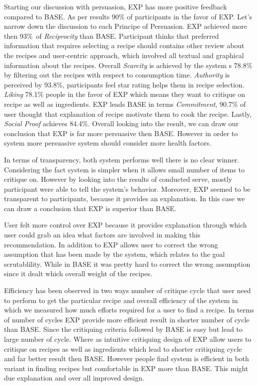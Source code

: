 Starting our discussion with persuasion, EXP has more positive feedback compared to BASE. As per results 90\% of participants in the favor of EXP. Let’s narrow down the discussion to each Principe of Persuasion.  EXP achieved more then 93\%\ of \textit{Reciprocity} than BASE. Participant thinks that preferred information that requires selecting a recipe should contains other review about the recipes and user-centric approach, which involved all textual and graphical information about the recipes.  Overall \textit{Scarcity} is achieved by the system s 78.8\% by filtering out the recipes with respect to consumption time. \textit{Authority} is perceived by 93.8\%, participants feel star rating helps them in recipe selection. \textit{Liking} 78.1\% people in the favor of EXP which means they want to critique on recipe as well as ingredients. EXP leads BASE in terms \textit{Commitment}, 90.7\% of user thought that explanation of recipe motivate them to cook the recipe. Lastly, 
\textit{Social Proof} achieves 84.4\%. Overall looking into the result, we can draw our conclusion that EXP is far more persuasive then BASE. However in order to system more persuasive system should consider more health factors. \newline

In terms of transparency, both system performs well there is no clear winner. Considering the fact system is simpler when it allows small number of items to critique on. However by looking into the results of conducted serve, mostly participant were able to tell the system’s behavior. Moreover, EXP seemed to be transparent to participants, because it provides an explanation. In this case we can draw a conclusion that EXP is superior than BASE. \newline

User felt more control over EXP because it provides explanation through which user could grab an idea what factors are involved in making this recommendation. In addition to EXP allows user to correct the wrong assumption that has been made by the system, which relates to the goal scrutablility. While in BASE it was pretty hard to correct the wrong assumption since it dealt which overall weight of the recipes. \newline

Efficiency has been observed in two ways number of critique cycle that user need to perform to get the particular recipe and overall efficiency of the system in which we measured how much efforts required for a user to find a recipe. In terms of number of cycles EXP provide more efficient result in shorter number of cycle than BASE. Since the critiquing criteria followed by BASE is easy but lead to large number of cycle. Where as intuitive critiquing design of EXP allow users to critique on recipes as well as ingredients which lead to shorter critiquing cycle and far better result then BASE. However people find system is efficient in both variant in finding recipes but comfortable in EXP more than BASE. This might due explanation and over all improved design. \newline

